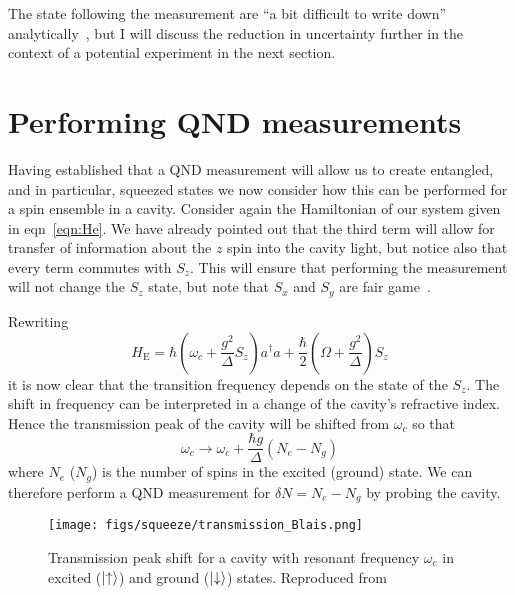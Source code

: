 \documentclass{article}
\begin{document}
The state following the measurement are ``a bit difficult to write down''
analytically~\cite{Cox2016}, but I will discuss the reduction in uncertainty
further in the context of a potential experiment in the next section.

\section{Performing QND measurements}

Having established that a QND measurement will allow us to create entangled,
and in particular, squeezed states we now consider how this can be performed
for a spin ensemble in a cavity. Consider again the Hamiltonian of our system
given in eqn~\ref{eqn:He}. We have already pointed out that the
third term will allow for transfer of information about the $z$ spin into the
cavity light, but notice also that every term commutes with $S_z$. This will
ensure that performing the measurement will not change the $S_z$ state, but
note that $S_x$ and $S_y$ are fair game~\cite{SchleierSmith2011}.

Rewriting
%
\begin{equation}
  H_\text{E}= 
    \hbar \left(\omega_c + \frac{g^2}{\Delta}S_z\right)a^\dagger a + 
    \frac{\hbar}{2}\left(\Omega + \frac{g^2}{\Delta}\right)S_z
\end{equation}
%
it is now clear that the transition frequency depends on the state of the
$S_z$. The shift in frequency can be interpreted in a change of the cavity's
refractive index. Hence the transmission peak of the cavity will be shifted
from $\omega_c$ so that
%
\begin{equation}
  \omega_c \rightarrow \omega_c + \frac{\hbar g}{\Delta}(N_e - N_g)
\end{equation}
%
where $N_e$ ($N_g$) is the number of spins in the excited (ground) state. We
can therefore perform a QND measurement for $\delta N = N_e - N_g$ by probing
the cavity.

\begin{figure}
  \centering
  \texttt{[image: figs/squeeze/transmission\_Blais.png]}
  \caption{Transmission peak shift for a cavity with resonant frequency
  $\omega_c$ in excited ($\ket{\uparrow}$) and ground ($\ket{\downarrow}$)
  states.  Reproduced from~\cite{PhysRevA.69.062320}}
  \label{transmission}
\end{figure}
\end{document}
